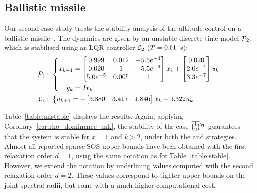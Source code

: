 \subsection{Ballistic missile}\label{sec:eval:unstable}
Our second case study treats the stability analysis of the altitude control on a ballistic missile~\cite{Blakelock:1991, Sree:2006}.
The dynamics are given by an unstable discrete-time model $\mathcal{P}_2$, which is stabilised using an LQR-controller $\mathcal{C}_2$ ($T = 0.01$~s):
\begin{equation*}
    \begin{aligned}
        \mathcal{P}_2: \,\, &\left\{
        \begin{aligned}
            x_{k+1} &= \begin{bmatrix}
                0.999 & 0.012 & -5.5 e^{-4} \\
                0.020 & 1 & -5.5 e^{-6} \\
                5.0 e^{-5} & 0.005 & 1 \\
            \end{bmatrix} x_k + \begin{bmatrix}
                0.020 \\
                2.0e^{-4} \\
                3.3e^{-7} \\
            \end{bmatrix}u_k \\
            y_k &= I x_k
        \end{aligned} \right. \\
        \mathcal{C}_2: \,\, &\left\{
        \begin{aligned}
            u_{k+1} &= -\begin{bmatrix}
                3.380 & 3.417 & 1.846
            \end{bmatrix} x_k - 0.322 u_k
        \end{aligned}\right.
    \end{aligned}
\end{equation*}

Table~\ref{table:unstable} displays the results.
Again, applying Corollary~\ref{cor:rho_dominance_mk}, the stability of the case $\overbar{\binom{1}{2}}^{\strat}$ guarantees that the system is stable for $x=1$ and $k>2$, under both the \tK{} and \tS{} strategies.
Almost all reported sparse SOS upper bounds have been obtained with the first relaxation order $d=1$, using the same notation as for Table~\ref{table:stable}.
However, we extend the notation by underlining values computed with the second relaxation order $d=2$.
These values correspond to tighter upper bounds on the joint spectral radii, but come with a much higher computational cost.
